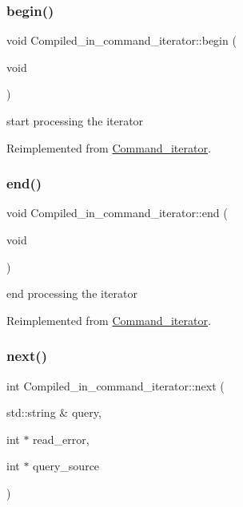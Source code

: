 \subsubsection{\texorpdfstring{begin()}{begin()}}
{\footnotesize\ttfamily void Compiled\+\_\+in\+\_\+command\+\_\+iterator\+::begin (\begin{DoxyParamCaption}\item[{void}]{ }\end{DoxyParamCaption})\hspace{0.3cm}{\ttfamily [virtual]}}

start processing the iterator 

Reimplemented from \mbox{\hyperlink{classCommand__iterator_a4b17b4b7b81c4bb2a5109eb0d5ab1e3c}{Command\+\_\+iterator}}.

\mbox{\label{classCompiled__in__command__iterator_a462b9632e92198deea287c08331a9137}} 
\subsubsection{\texorpdfstring{end()}{end()}}
{\footnotesize\ttfamily void Compiled\+\_\+in\+\_\+command\+\_\+iterator\+::end (\begin{DoxyParamCaption}\item[{void}]{ }\end{DoxyParamCaption})\hspace{0.3cm}{\ttfamily [virtual]}}

end processing the iterator 

Reimplemented from \mbox{\hyperlink{classCommand__iterator_a564873043bc5c6e7f13916042ce320a3}{Command\+\_\+iterator}}.

\mbox{\label{classCompiled__in__command__iterator_ab39e0e08ac52836b136a0ec82f53a084}} 
\subsubsection{\texorpdfstring{next()}{next()}}
{\footnotesize\ttfamily int Compiled\+\_\+in\+\_\+command\+\_\+iterator\+::next (\begin{DoxyParamCaption}\item[{std\+::string \&}]{query,  }\item[{int $\ast$}]{read\+\_\+error,  }\item[{int $\ast$}]{query\+\_\+source }\end{DoxyParamCaption})\hspace{0.3cm}{\ttfamily [virtual]}}

